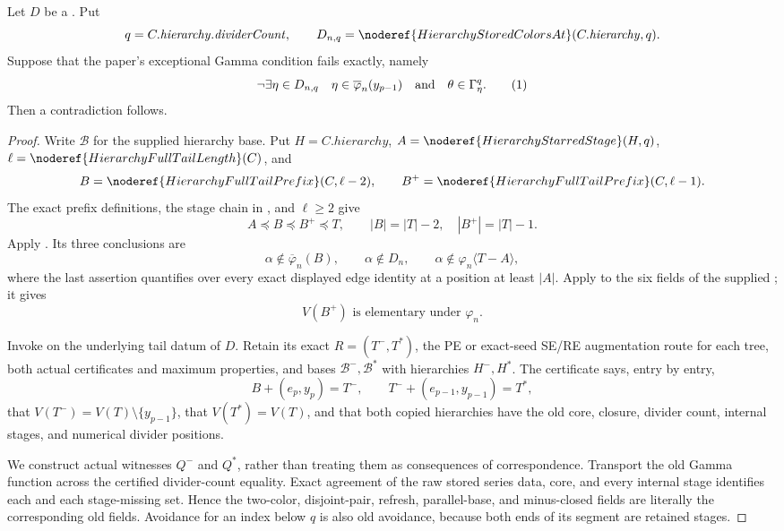 \begin{lemma}
Let \(D\) be a .  Put
\[
 q=C.\mathit{hierarchy}.\mathit{dividerCount},\qquad
 D_{n,q}=\noderef{HierarchyStoredColorsAt}(C.\mathit{hierarchy},q).
\]
Suppose that the paper's exceptional Gamma condition fails exactly, namely
\[
 \neg\exists\eta\in D_{n,q}\quad
   \eta\in\overline\varphi_n(y_{p-1})
   \quad\hbox{and}\quad \theta\in\Gamma^q_\eta .            \tag{1}
\]
Then a contradiction follows.
\end{lemma}
\begin{proof}
Write \(\mathcal B\) for the supplied hierarchy base.  Put
\(H=C.\mathit{hierarchy}\),
\(A=\noderef{HierarchyStarredStage}(H,q)\),
\(\ell=\noderef{HierarchyFullTailLength}(C)\), and
\[
 B=\noderef{HierarchyFullTailPrefix}(C,\ell-2),\qquad
 B^+=\noderef{HierarchyFullTailPrefix}(C,\ell-1).
\]
The exact prefix definitions, the stage chain in
, and \(\ell\ge2\) give
\[
 A\preccurlyeq B\preccurlyeq B^+\preccurlyeq T,\qquad
 |B|=|T|-2,\quad |B^+|=|T|-1.                              \tag{2}
\]
Apply .  Its three
conclusions are
\[
 \alpha\notin\overline\varphi_n(B),\qquad
 \alpha\notin D_n,\qquad
 \alpha\notin\varphi_n\langle T-A\rangle,                  \tag{3}
\]
where the last assertion quantifies over every exact displayed edge
identity at a position at least \(|A|\).  Apply
 to the six fields
of the supplied ; it gives
\[
              V(B^+)\text{ is elementary under }\varphi_n. \tag{4}
\]

Invoke  on the
underlying tail datum of \(D\).  Retain its exact
 \(R=(T^-,T^*)\), the PE or
exact-seed SE/RE augmentation route for each tree, both actual
 certificates and maximum
properties, and bases \(\mathcal B^-,\mathcal B^*\) with hierarchies
\(H^-,H^*\).  The certificate says, entry by entry,
\[
 B+(e_p,y_p)=T^-,\qquad
 T^-+(e_{p-1},y_{p-1})=T^*,                                \tag{5}
\]
that \(V(T^-)=V(T)\setminus\{y_{p-1}\}\), that
\(V(T^*)=V(T)\), and that both copied hierarchies have the old core,
closure, divider count, internal stages, and numerical divider positions.

We construct actual  witnesses \(Q^-\) and
\(Q^*\), rather than treating them as consequences of correspondence.
Transport the old Gamma function across the certified divider-count
equality.  Exact agreement of the raw stored series data, core, and every
internal stage identifies each  and each
stage-missing set.  Hence the two-color, disjoint-pair, refresh,
parallel-base, and minus-closed fields are literally the corresponding
old fields.  Avoidance for an index below \(q\) is also old avoidance,
because both ends of its segment are retained stages.


\end{proof}

